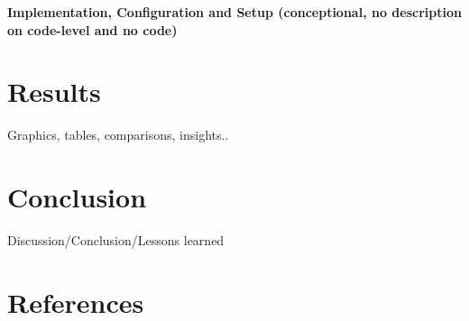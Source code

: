 \documentclass[a4paper,12pt]{article}
\begin{document}
 
 
\textbf{Implementation, Configuration and Setup (conceptional, no description
on code-level and no code)}

\section{Results}
Graphics, tables, comparisons, insights..

\section{Conclusion}

Discussion/Conclusion/Lessons learned

\section{References}
\end{document}
